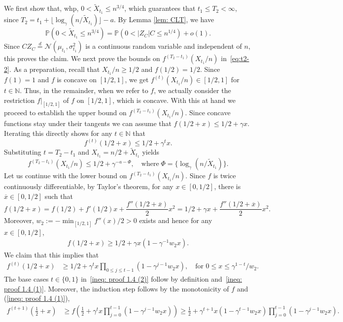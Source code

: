 \documentclass[11pt]{article}
\newcommand{\Prob}{\mathbb{P}}
\numberwithin{theorem}{section}
\begin{document}
We first show that, whp, $0<\tilde X_{t_1} \leq n^{3/4}$, which guarantees that $t_1 \leq T_2 <\infty$, since $T_2  = t_1 + \lfloor\log_\gamma(n/\tilde X_{t_1})\rfloor-a$.
By Lemma \ref{lem: CLT}, we have
\[
    \Prob(0<\tilde X_{t_1}\leq n^{3/4}) = \Prob(0<|Z_C|C \leq n^{1/4}) + o(1).
\]
Since $CZ_C \stackrel{d}{=} \mathcal{N}(\mu_{t_1},\sigma_{t_1}^2)$
is a continuous random variable and independent of $n$, this proves the claim. 
We next prove the bounds on $f^{(T_2-t_1)}(X_{t_1}/n)$ in~\eqref{eq:t2-2}. 
As a preparation, recall that $X_{t_1}/n \geq 1/2$ and $f(1/2)=1/2$. Since $f(1)=1$ and $f$ is concave on $[1/2,1]$, we get $f^{(t)}(X_{t_1}/n) \in [1/2,1]$ for $t\in \mathbb{N}$. Thus, in the remainder, when we refer to $f$, we actually consider the restriction $f|_{[1/2,1]}$ of $f$ on $[1/2,1]$, which is concave. With this at hand we proceed to establish the upper bound on $f^{(T_2-t_1)}(X_{t_1}/n)$.
Since concave functions stay under their tangents we can assume that $f(1/2+x)\leq 1/2+ \gamma x$. Iterating this directly shows for any $t\in \mathbb{N}$ that
\[
f^{(t)}(1/2+x) \leq 1/2 + \gamma^{t} x.
\]
Substituting $t=T_2-t_1$ and $ X_{t_1}=n/2+\tilde X_{t_1}$ yields
\[
 f^{(T_2-t_1)}(X_{t_1}/n) \leq 1/2 +\gamma^{-a-\Phi},
 \quad
 \text{where}\;
 \Phi = \{\log_\gamma(n/\tilde X_{t_1})\}.
\]
Let us continue with the lower bound on $f^{(T_2-t_1)}(X_{t_1}/n)$.
Since $f$ is twice continuously differentiable, by Taylor's theorem, for any $x\in[0,1/2]$, there is $\overline{x} \in [0,1/2]$ such that
\[
f(1/2+x) = f(1/2) + f'(1/2)x + \frac{f''(1/2+\overline{x})}{2}x^2 =1/2+ \gamma x + \frac{f''(1/2+\overline{x})}{2}x^2.
\]
Moreover, $w_2:=-\min_{[1/2,1]}f''(x)/2>0$ exists and hence for any $x\in[0,1/2]$,
\begin{align}\label{ineq: proof 1.4 (1)}
f(1/2+x) \geq 1/2 + \gamma x (1-\gamma^{-1}w_2x).
\end{align}
We claim that this implies that
\begin{align}\label{ineq: proof 1.4 (2)}
    f^{(t)}(1/2+x) &\geq 1/2+ \gamma^{t} x  \prod_{0\leq j\leq t-1}\left(1- \gamma^{j-1}w_2 x\right),
    \quad \text{for } 0\leq x \leq \gamma^{1-t}/w_2.
\end{align}
The base cases $t\in \{0,1\}$ in~\eqref{ineq: proof 1.4 (2)} follow by definition and~\eqref{ineq: proof 1.4 (1)}. Moreover, the induction step follows by the monotonicity of $f$ and (\ref{ineq: proof 1.4 (1)}),
\begin{align*}
f^{(t+1)}\left(\frac12+x\right) &\geq f\left(\frac{1}{2}+\gamma^{t} x \prod_{j=0}^{t-1}\left(1-\gamma^{j-1}w_2 x \right)\right)
\geq \frac{1}{2} +\gamma^{t+1} x  \left(1- \gamma^{t-1}w_2x\right) \prod_{j=0}^{t-1}\left(1- \gamma^{j-1}w_2 x\right).
\end{align*}
\end{document}
